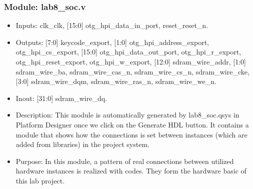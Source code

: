\documentclass[11pt]{article}
\begin{document}
\subsubsection{Module: lab8\_soc.v}
\begin{itemize}
\item Inputs: clk\_clk, [15:0] otg\_hpi\_data\_in\_port, reset\_reset\_n.
\item Outputs: [7:0] keycode\_export, [1:0] otg\_hpi\_address\_export, otg\_hpi\_cs\_export, [15:0] otg\_hpi\_data\_out\_port, otg\_hpi\_r\_export, otg\_hpi\_reset\_export, otg\_hpi\_w\_export, [12:0] sdram\_wire\_addr, [1:0] sdram\_wire\_ba, sdram\_wire\_cas\_n, sdram\_wire\_cs\_n, sdram\_wire\_cke, [3:0] sdram\_wire\_dqm, sdram\_wire\_ras\_n, sdram\_wire\_we\_n.
\item Inout: [31:0] sdram\_wire\_dq.
\item Description: This module is automatically generated by lab8\_soc.qsys in Platform Designer once we click on the Generate HDL button. It contains a module that shows how the connections is set between instances (which are added from libraries) in the project system.
\item Purpose: In this module, a pattern of real connections between utilized hardware instances is realized with codes. They form the hardware basic of this lab project.
\end{itemize}
\end{document}
